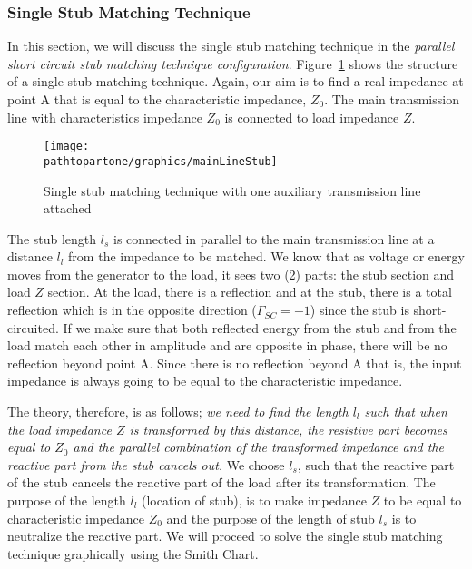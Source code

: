 \subsubsection{Single Stub Matching Technique}
In this section, we will discuss the single stub matching technique in the \textit{parallel short circuit stub matching technique configuration}. Figure~\ref{fig:fig11} shows the structure of a single stub matching technique. Again, our aim is to find a real impedance at point A that is equal to the characteristic impedance, $Z_0$. The main transmission line with characteristics impedance $ Z_0$ is connected to load impedance $Z$.
\begin{figure}[h]
\centering
\texttt{[image: \\pathtopartone/graphics/mainLineStub]}
\caption{Single stub matching technique with one auxiliary transmission line attached}
\label{fig:fig11}
\end{figure}

The stub length $l_s$ is connected in parallel to the main transmission line at a distance $ l_l$ from the impedance to be matched. We know that as voltage or energy moves from the generator to the load, it sees two (2) parts: the stub section and load $Z$ section. At the load, there is a reflection and at the stub, there is a total reflection which is in the opposite direction ($\Gamma_{SC} = -1$) since the stub is short-circuited. If we make sure that both reflected energy from the stub and from the load match each other in amplitude and are opposite in phase, there will be no reflection beyond point A. Since there is no reflection beyond A that is, the input impedance is always going to be equal to the characteristic impedance.

The theory, therefore, is as follows; \emph{we need to find the length $ l_l$ such that when the load impedance $Z$ is transformed by this distance, the resistive part becomes equal to $Z_0$ and the parallel combination of the transformed impedance and the reactive part from the stub cancels out.} We choose $l_s$, such that the reactive part of the stub cancels the reactive part of the load after its transformation. The purpose of the length $l_l$ (location of stub), is to make impedance $Z$ to be equal to characteristic impedance $Z_0$ and the purpose of the length of stub $l_s$ is to neutralize the reactive part. We will proceed to solve the single stub matching technique graphically using the Smith Chart.

